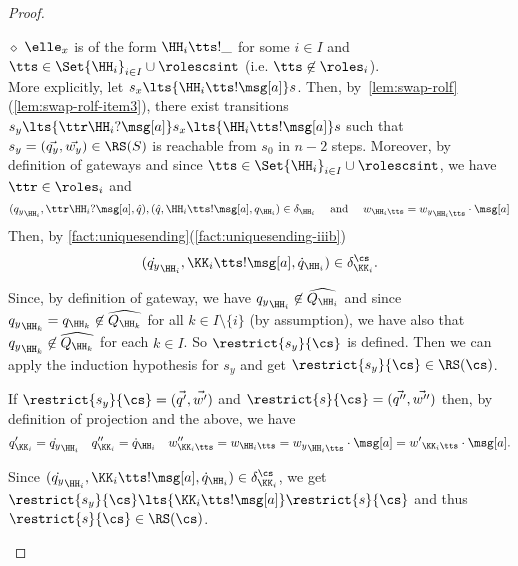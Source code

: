 \begin{proof}
\begin{description}
\underline{$\diamond$}
$\elle_x$ is of the form $\HH_i\tts!\_$ for some $i\in I$ and $\tts\in\Set{\HH_i}_{i\in I}\cup\rolescsint$ (i.e. $\tts\not\in\roles_i$).\\
More explicitly, let $s_x\lts{\HH_i\tts!\msg[a]}s$. 
Then, by~\cref{lem:swap-rolf}(\ref{lem:swap-rolf-item3}), there exist transitions
$s_y \lts{\ttr\HH_i?\msg[a]}s_x\lts{\HH_i\tts!\msg[a]}s$
such that $s_y = (\vec{q_y},\vec{w_y})\in \RS(S)$ is reachable from $s_0$ in $n-2$ steps.
Moreover, by definition of gateways and since 
$\tts\in\Set{\HH_i}_{i\in I}\cup\rolescsint$, we have $\ttr\in\roles_i$ and
$$({q_y}_{\HH_i},\ttr\HH_i?\msg[a],\hat q),
    (\hat q, \HH_i\tts!\msg[a], q_{\HH_i})\in\delta_{\HH_i}
\quad\text{ and }\quad w_{\HH_i\tts} = {w_y}_{\HH_i\tts}\cdot \msg[a]$$
Then,  by \cref{fact:uniquesending}(\ref{fact:uniquesending-iiib}) %
$$(\dot{q_y}_{\HH_i} %
,\KK_i\tts!\msg[a],\dot{q}_{\HH_i})\in \delta^\cs_{\KK_i}.$$

Since, by definition of gateway, we have
${q_y}_{\HH_i}\not\in\widehat{Q_{\HH_i}}$ and since
${q_y}_{\HH_k} = q_{\HH_k}\not\in\widehat{Q_{\HH_k}}$
for all $k\in I\setminus\{i\}$ (by assumption),
we have also that ${q_y}_{\HH_k}\not\in\widehat{Q_{\HH_k}}$ for each $k\in I$. 
So  $\restrict{s_y}{\cs}$ is defined.
Then we can apply the induction hypothesis for $s_y$ and get 
$\restrict{s_y}{\cs}\in \RS(\cs)$. 

If $\restrict{s_y}{\cs} = (\vec{q'},\vec{w'})$
and $\restrict{s}{\cs} = (\vec{q''},\vec{w''})$ then,
 by definition of projection and the above, we have 
$$q'_{\KK_i} = \dot{{{q}}_y}_{\HH_i} \quad
q''_{\KK_i} = \dot{{{q}}}_{\HH_i} \quad
w''_{\KK_i\tts} = w_{\HH_i\tts} = {w_y}_{\HH_i\tts}\cdot \msg[a] = {w'}_{\KK_i\tts}\cdot \msg[a].$$

Since $(\dot{q_y}_{\HH_i} %
,\KK_i\tts!\msg[a],\dot{q}_{\HH_i})\in \delta^\cs_{\KK_i}$,
we get $\restrict{s_y}{\cs}\lts{\KK_i\tts!\msg[a]}\restrict{s}{\cs}$ and thus $\restrict{s}{\cs}\in \RS(\cs)$.
\end{description}
\end{proof}




